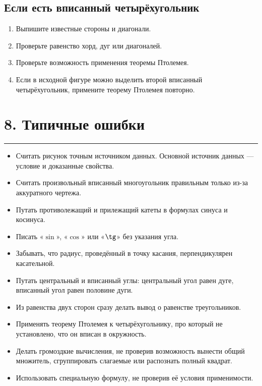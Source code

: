 \documentclass[a4paper,12pt]{article}
\newcommand{\sectionrule}{
  \par
  \vspace{0.2em}
  \noindent
  \textcolor{accent}{\rule{\linewidth}{0.7pt}}
  \vspace{0.35em}
}
\begin{document}
\subsection*{Если есть вписанный четырёхугольник}

\begin{enumerate}

  \item Выпишите известные стороны и диагонали.

  \item Проверьте равенство хорд,
  дуг или диагоналей.

  \item Проверьте возможность применения
  теоремы Птолемея.

  \item Если в исходной фигуре можно выделить
  второй вписанный четырёхугольник,
  примените теорему Птолемея повторно.

\end{enumerate}

\section*{8. Типичные ошибки}
\sectionrule

\begin{itemize}

  \item Считать рисунок точным источником данных.
  Основной источник данных --- условие и доказанные свойства.

  \item Считать произвольный вписанный многоугольник
  правильным только из-за аккуратного чертежа.

  \item Путать противолежащий и прилежащий катеты
  в формулах синуса и косинуса.

  \item Писать «\(\sin\)», «\(\cos\)» или «\(\tg\)»
  без указания угла.

  \item Забывать, что радиус,
  проведённый в точку касания,
  перпендикулярен касательной.

  \item Путать центральный и вписанный углы:
  центральный угол равен дуге,
  вписанный угол равен половине дуги.

  \item Из равенства двух сторон
  сразу делать вывод о равенстве треугольников.

  \item Применять теорему Птолемея
  к четырёхугольнику,
  про который не установлено,
  что он вписан в окружность.

  \item Делать громоздкие вычисления,
  не проверив возможность вынести общий множитель,
  сгруппировать слагаемые
  или распознать полный квадрат.

  \item Использовать специальную формулу,
  не проверив её условия применимости.

\end{itemize}
\end{document}
